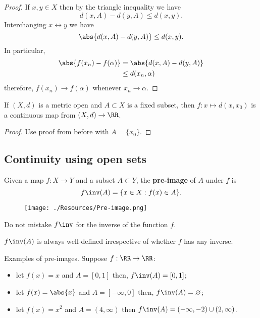 \documentclass[12pt, a4paper]{article}
\begin{document}
\begin{proof}
    If \(x,y \in X\) then by the triangle inequality we have 
    \[d(x,A)-d(y,A) \leq d(x,y).\]
    Interchanging \(x \leftrightarrow y\) we have 
    \[\abs{d(x,A)-d(y,A)} \leq d(x,y).\]
    In particular,
    \[\begin{aligned}
        \abs{f(x_n)-f(\alpha)} &= \abs{d(x,A)-d(y,A)} \\
        &\leq d(x_n,\alpha)
    \end{aligned}\]
    therefore, \(f(x_n) \to f(\alpha)\) whenever \(x_n \to \alpha\).
\end{proof}

\begin{lemma}
    If \((X,d)\) is a metric open and \(A \subset X\) is a fixed subset, then \(f : x \mapsto d(x,x_0)\) is a continuous map from \((X,d) \to \RR\).
\end{lemma}

\begin{proof}
    Use proof from before with \(A = \{x_0\}\).
\end{proof}

\subsection{Continuity using open sets}

\begin{definition}
    Given a map \(f : X \to Y\) and a subset \(A \subset Y\), the 
    \textbf{pre-image} of \(A\) under \(f\) is 
    \[f\inv(A) = \{x \in X : f(x) \in A\}.\]
    \begin{figure}[H]
         \begin{center}
             \texttt{[image: ./Resources/Pre-image.png]}
         \end{center}
    \end{figure}
\end{definition}

\begin{mdnote}
    Do not mistake \(f\inv\) for the inverse of the function \(f\).
\end{mdnote}

\begin{mdremark}
    \(f\inv(A)\) is always well-defined irrespective of whether \(f\) has any inverse.
\end{mdremark}

\begin{mdexample}
    Examples of pre-images. Suppose \(f : \RR \to \RR\):
    \begin{itemize}
        \item let \(f(x)=x\) and \(A =[0,1]\) then, \(f\inv(A)=[0,1]\);
        \item let \(f(x)= \abs{x}\)  and \(A=[-\infty,0]\) then, \(f\inv(A)=\varnothing\);
        \item let \(f(x)=x^2\) and \(A=(4,\infty)\) then \(f\inv(A)=(-\infty,-2) \cup (2,\infty)\).
    \end{itemize}
\end{mdexample}
\end{document}
